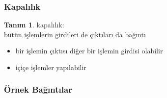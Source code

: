 \documentclass[dvipsnames]{beamer}
\theoremstyle{definition}
\newtheorem{tanim}[theorem]{Tanım}
\theoremstyle{example}
\theoremstyle{plain}
\begin{document}
\begin{frame}
  \frametitle{Kapalılık}

  \begin{tanim}
    \alert{kapalılık}:\\
      bütün işlemlerin girdileri de çıktıları da bağıntı
  \end{tanim}

  \pause
  \begin{itemize}
    \item bir işlemin çıktısı diğer bir işlemin girdisi olabilir
    \item içiçe işlemler yapılabilir
  \end{itemize}
\end{frame}

\begin{frame}
  \frametitle{Örnek Bağıntılar}


\end{frame}
\end{document}
